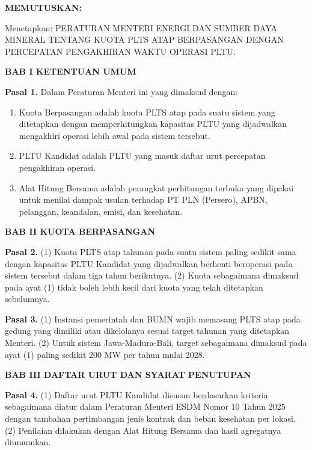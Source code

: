 \begin{center}\textbf{MEMUTUSKAN:}\end{center}
\noindent Menetapkan: PERATURAN MENTERI ENERGI DAN SUMBER DAYA MINERAL TENTANG KUOTA PLTS ATAP BERPASANGAN DENGAN PERCEPATAN PENGAKHIRAN WAKTU OPERASI PLTU.

\begin{center}\textbf{BAB I KETENTUAN UMUM}\end{center}
\noindent\textbf{Pasal 1.} Dalam Peraturan Menteri ini yang dimaksud dengan:
\begin{enumerate}
  \item Kuota Berpasangan adalah kuota PLTS atap pada suatu sistem yang ditetapkan dengan memperhitungkan kapasitas PLTU yang dijadwalkan mengakhiri operasi lebih awal pada sistem tersebut.
  \item PLTU Kandidat adalah PLTU yang masuk daftar urut percepatan pengakhiran operasi.
  \item Alat Hitung Bersama adalah perangkat perhitungan terbuka yang dipakai untuk menilai dampak usulan terhadap PT PLN (Persero), APBN, pelanggan, keandalan, emisi, dan kesehatan.
\end{enumerate}

\begin{center}\textbf{BAB II KUOTA BERPASANGAN}\end{center}
\noindent\textbf{Pasal 2.} (1) Kuota PLTS atap tahunan pada suatu sistem paling sedikit sama dengan kapasitas PLTU Kandidat yang dijadwalkan berhenti beroperasi pada sistem tersebut dalam tiga tahun berikutnya. (2) Kuota sebagaimana dimaksud pada ayat (1) tidak boleh lebih kecil dari kuota yang telah ditetapkan sebelumnya.

\noindent\textbf{Pasal 3.} (1) Instansi pemerintah dan BUMN wajib memasang PLTS atap pada gedung yang dimiliki atau dikelolanya sesuai target tahunan yang ditetapkan Menteri. (2) Untuk sistem Jawa-Madura-Bali, target sebagaimana dimaksud pada ayat (1) paling sedikit 200 MW per tahun mulai 2028.

\begin{center}\textbf{BAB III DAFTAR URUT DAN SYARAT PENUTUPAN}\end{center}
\noindent\textbf{Pasal 4.} (1) Daftar urut PLTU Kandidat disusun berdasarkan kriteria sebagaimana diatur dalam Peraturan Menteri ESDM Nomor 10 Tahun 2025 dengan tambahan pertimbangan jenis kontrak dan beban kesehatan per lokasi. (2) Penilaian dilakukan dengan Alat Hitung Bersama dan hasil agregatnya diumumkan.

